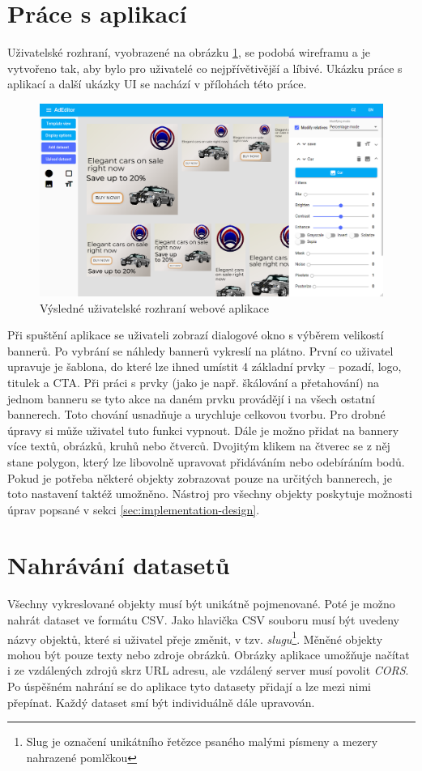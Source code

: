 \section{Práce s aplikací}
    Uživatelské rozhraní, vyobrazené na obrázku \ref{fig:ad-editor-ui}, se podobá wireframu a je vytvořeno tak, aby bylo pro uživatelé co nejpřívětivější a líbivé.
    Ukázku práce s aplikací a další ukázky UI se nachází v přílohách této práce.
    \begin{figure}[h]
        \centering
        \includegraphics[width=1\textwidth]{Figures/ad-editor.png}
        \caption[UI webové aplikace]{Výsledné uživatelské rozhraní webové aplikace}
        \label{fig:ad-editor-ui}
    \end{figure}
    Při spuštění aplikace se uživateli zobrazí dialogové okno s výběrem velikostí bannerů. Po vybrání se náhledy bannerů vykreslí na plátno.
    První co uživatel upravuje je šablona, do které lze ihned umístit 4 základní prvky -- pozadí, logo, titulek a CTA.
    Při práci s prvky (jako je např. škálování a přetahování) na jednom banneru
    se tyto akce na daném prvku provádějí i na všech ostatní bannerech. Toto chování usnadňuje a urychluje celkovou tvorbu.
    Pro drobné úpravy si může uživatel tuto funkci vypnout.
    Dále je možno přidat na bannery více textů, obrázků, kruhů nebo čtverců. Dvojitým klikem na čtverec se z něj stane polygon, který lze libovolně upravovat
    přidáváním nebo odebíráním bodů. Pokud je potřeba některé objekty zobrazovat pouze na určitých bannerech, je toto nastavení taktéž umožněno.
    Nástroj pro všechny objekty poskytuje možnosti úprav popsané v sekci \ref{sec:implementation-design}.

\section{Nahrávání datasetů}
    Všechny vykreslované objekty musí být unikátně pojmenované.
    Poté je možno nahrát dataset ve formátu CSV. Jako hlavička CSV souboru musí být uvedeny názvy objektů, které si uživatel přeje změnit, v tzv.
    \emph{slugu}\footnote[2]{Slug je označení unikátního řetězce psaného malými písmeny a mezery nahrazené pomlčkou}. Měněné objekty mohou být pouze texty nebo zdroje obrázků. Obrázky aplikace umožňuje načítat i ze vzdálených zdrojů skrz 
    URL adresu, ale vzdálený server musí povolit \emph{CORS}. Po úspěšném nahrání se do aplikace tyto datasety přidají a lze mezi nimi přepínat. Každý
    dataset smí být individuálně dále upravován.

